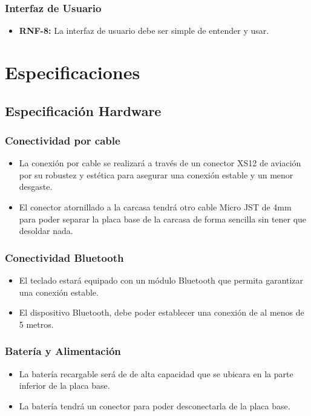 \subsubsection{Interfaz de Usuario} \label{DiseñoInterfazUsuario}
\begin{itemize}
\item \textbf{RNF-8:} La interfaz de usuario debe ser simple de entender y usar.
\end{itemize}

\section{Especificaciones}

\subsection{Especificación Hardware}

\subsubsection{Conectividad por cable}
\begin{itemize}
\item La conexión por cable se realizará a través de un conector XS12 de aviación por su robustez y estética para asegurar una conexión estable y un menor desgaste.
\item El conector atornillado a la carcasa tendrá otro cable Micro JST de 4mm para poder separar la placa base de la carcasa de forma sencilla sin tener que desoldar nada.
\end{itemize}

\subsubsection{Conectividad \gls{Bluetooth}}
\begin{itemize}
\item El teclado estará equipado con un módulo \gls{Bluetooth} que permita garantizar una conexión estable.
\item El dispositivo \gls{Bluetooth}, debe poder establecer una conexión de al menos de 5 metros.
\end{itemize}

\subsubsection{Batería y Alimentación} \label{DiseñoBateriaAlimentacion}
\begin{itemize}
\item La batería recargable será de  de alta capacidad que se ubicara en la parte inferior de la placa base.
\item La batería tendrá un conector para poder desconectarla de la placa base.
\end{itemize}

